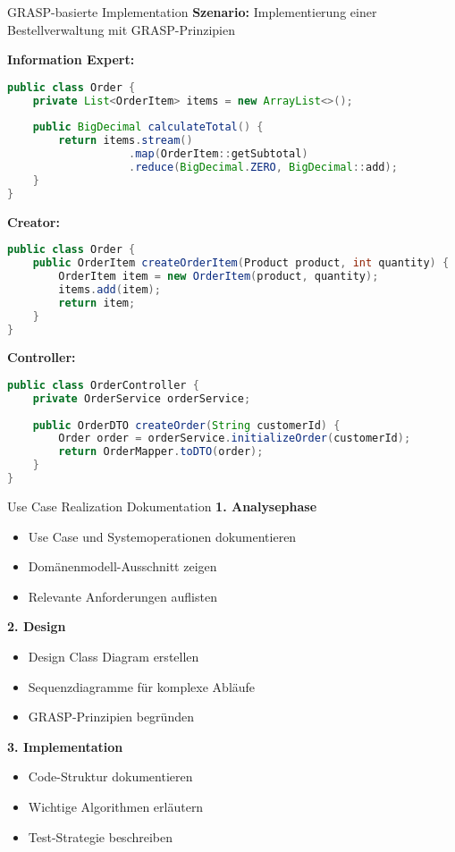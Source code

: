 \begin{example2}{GRASP-basierte Implementation}
\textbf{Szenario:} Implementierung einer Bestellverwaltung mit GRASP-Prinzipien

\textbf{Information Expert:}
\begin{lstlisting}[language=Java, style=basesmol]
public class Order {
    private List<OrderItem> items = new ArrayList<>();
    
    public BigDecimal calculateTotal() {
        return items.stream()
                   .map(OrderItem::getSubtotal)
                   .reduce(BigDecimal.ZERO, BigDecimal::add);
    }
}
\end{lstlisting}

\textbf{Creator:}
\begin{lstlisting}[language=Java, style=basesmol]
public class Order {
    public OrderItem createOrderItem(Product product, int quantity) {
        OrderItem item = new OrderItem(product, quantity);
        items.add(item);
        return item;
    }
}
\end{lstlisting}

\textbf{Controller:}
\begin{lstlisting}[language=Java, style=basesmol]
public class OrderController {
    private OrderService orderService;
    
    public OrderDTO createOrder(String customerId) {
        Order order = orderService.initializeOrder(customerId);
        return OrderMapper.toDTO(order);
    }
}
\end{lstlisting}
\end{example2}

\begin{KR}{Use Case Realization Dokumentation}
\textbf{1. Analysephase}
\begin{itemize}
    \item Use Case und Systemoperationen dokumentieren
    \item Domänenmodell-Ausschnitt zeigen
    \item Relevante Anforderungen auflisten
\end{itemize}

\textbf{2. Design}
\begin{itemize}
    \item Design Class Diagram erstellen
    \item Sequenzdiagramme für komplexe Abläufe
    \item GRASP-Prinzipien begründen
\end{itemize}

\textbf{3. Implementation}
\begin{itemize}
    \item Code-Struktur dokumentieren
    \item Wichtige Algorithmen erläutern
    \item Test-Strategie beschreiben
\end{itemize}
\end{KR}


